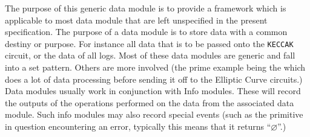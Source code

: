 The purpose of this generic data module is to provide a framework which is applicable to most data module that are left unspecified in the present specification. The purpose of a data module is to store data with a common destiny or purpose. For instance all data that is to be passed onto the \texttt{KECCAK} circuit, or the data of all logs. Most of these data modules are generic and fall into a set pattern. Others are more involved (the prime example being the 
\ecDataMod{} which does a lot of data processing before sending it off to the Elliptic Curve circuits.) Data modules usually work in conjunction with Info modules. These will record the outputs of the operations performed on the data from the associated data module. Such info modules may also record special events (such as the primitive in question encountering an error, typically this means that it returns
``$\varnothing$''.) 
